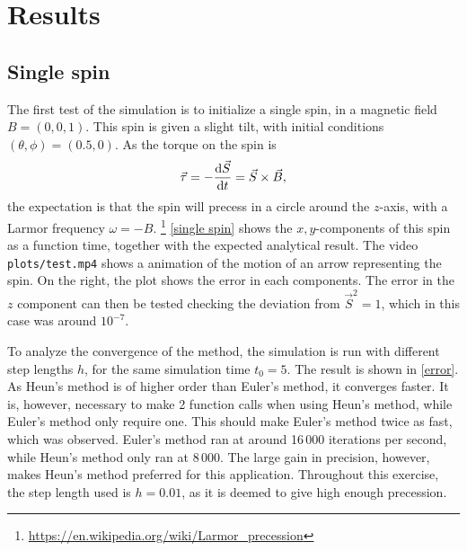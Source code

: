 \documentclass{article}
\begin{document}
    \section*{Results}
    \subsection*{Single spin}

    The first test of the simulation is to initialize a single spin, in a magnetic field $B = (0, 0, 1)$.
    This spin is given a slight tilt, with initial conditions $(\theta, \phi) = (0.5, 0)$.
    As the torque on the spin is 
    \begin{equation*}
        \vec \tau = -\dv{\vec S}{t} = \vec{S} \times \vec{B},
    \end{equation*}
    the expectation is that the spin will precess in a circle around the $z$-axis, with a Larmor frequency $\omega = -B$.
    \footnote{\url{https://en.wikipedia.org/wiki/Larmor_precession}}
    \autoref{single spin} shows the $x,y$-components of this spin as a function time, together with the expected analytical result.
    The video \verb|plots/test.mp4| shows a animation of the motion of an arrow representing the spin. On the right, the plot shows the error in each components.
    The error in the $z$ component can then be tested checking the deviation from $\vec S^2=1$, which in this case was around $10^{-7}$.

    To analyze the convergence of the method, the simulation is run with different step lengths $h$, for the same simulation time $t_0 = 5$.
    The result is shown in \autoref{error}.
    As Heun's method is of higher order than Euler's method, it converges faster.
    It is, however, necessary to make 2 function calls when using Heun's method, while Euler's method only require one.
    This should make Euler's method twice as fast, which was observed.
    Euler's method ran at around 16\,000 iterations per second, while Heun's method only ran at 8\,000.
    The large gain in precision, however, makes Heun's method preferred for this application. 
    Throughout this exercise, the step length used is $h=0.01$, as it is deemed to give high enough precession.
\end{document}
